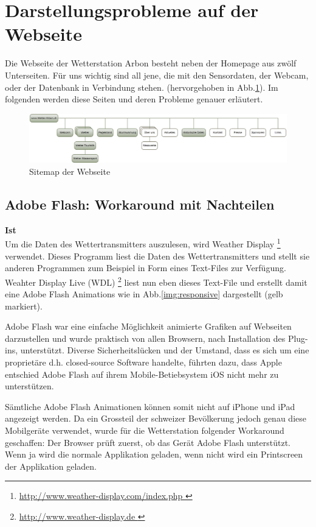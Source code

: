 \section{Darstellungsprobleme auf der Webseite}
Die Webseite der Wetterstation Arbon besteht neben der Homepage aus zwölf Unterseiten. Für uns wichtig sind all jene, die mit den Sensordaten, der Webcam, oder der Datenbank in Verbindung stehen. (hervorgehoben in Abb.\ref{img:sitemap}). Im folgenden werden diese Seiten und deren Probleme genauer erläutert.

\begin{figure}[h!]
	\centering
	\includegraphics[width=0.9\linewidth]{img/sitemap2}
	\caption{Sitemap der Webseite}
	\label{img:sitemap}
\end{figure}


\subsection{Adobe Flash: Workaround mit Nachteilen}

\textbf{Ist}\\
Um die Daten des Wettertransmitters auszulesen, wird Weather Display \footnote{ \url{http://www.weather-display.com/index.php }} verwendet. Dieses Programm liest die Daten des Wettertransmitters und stellt sie anderen Programmen zum Beispiel in Form eines Text-Files zur Verfügung. Weahter Display Live (WDL) \footnote{ \url{http://www.weather-display.de }} liest nun eben dieses Text-File und erstellt damit eine Adobe Flash Animations wie in Abb.\ref{img:responsive} dargestellt (gelb markiert).

Adobe Flash war eine einfache Möglichkeit animierte Grafiken auf Webseiten darzustellen und wurde praktisch von allen Browsern, nach Installation des Plug-ins, unterstützt. Diverse Sicherheitslücken und der Umstand, dass es sich um eine proprietäre d.h. closed-source Software handelte, führten dazu, dass Apple entschied Adobe Flash auf ihrem Mobile-Betiebsystem iOS nicht mehr zu unterstützen. \cite{Apple:ThoughtsOnFlash} 

Sämtliche Adobe Flash Animationen können somit nicht auf iPhone und iPad angezeigt werden. Da ein Grossteil der schweizer Bevölkerung jedoch genau diese Mobilgeräte verwendet, wurde für die Wetterstation folgender Workaround geschaffen: Der Browser prüft zuerst, ob das Gerät Adobe Flash unterstützt. Wenn ja wird die normale Applikation geladen, wenn nicht wird ein Printscreen der Applikation geladen.


